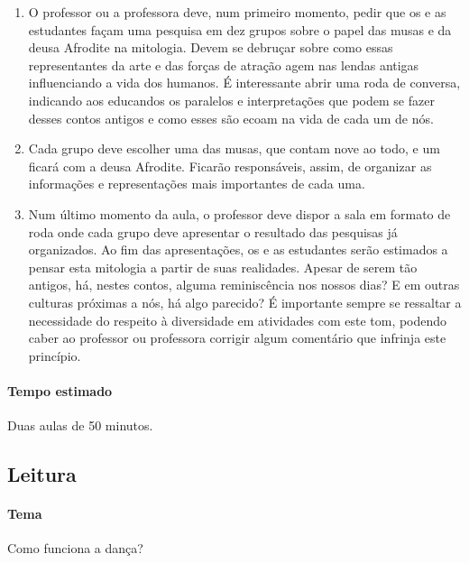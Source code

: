 \documentclass[12pt]{extarticle}
\begin{document}
\begin{enumerate}

  \item
  O professor ou a professora deve, num primeiro momento, pedir que os e as estudantes façam
  uma pesquisa em dez grupos sobre o papel das musas e da deusa Afrodite na mitologia. 
  Devem se debruçar sobre como essas representantes da arte e das forças de atração agem nas lendas antigas 
  influenciando a vida dos humanos. É interessante abrir uma roda de conversa, 
  indicando aos educandos os paralelos e interpretações que podem se fazer desses 
  contos antigos e como esses são ecoam na vida de cada um de nós.

  \item
  Cada grupo deve escolher uma das musas, que contam nove ao todo, e um ficará com a deusa
  Afrodite. Ficarão responsáveis, assim, de organizar as informações e representações
  mais importantes de cada uma. 

  \item
  Num último momento da aula, o professor deve dispor a sala em formato de 
  roda onde cada grupo deve apresentar o resultado das pesquisas já 
  organizados. Ao fim das apresentações, os e as estudantes serão estimados
  a pensar esta mitologia a partir de suas realidades. Apesar de serem tão antigos,
  há, nestes contos, alguma reminiscência nos nossos dias? E em outras culturas
  próximas a nós, há algo parecido? É importante sempre se ressaltar
  a necessidade do respeito à diversidade em atividades com este tom, podendo
  caber ao professor ou professora corrigir algum comentário que infrinja
  este princípio.

\end{enumerate}

\paragraph{Tempo estimado} Duas aulas de 50 minutos.

 
\subsection{Leitura}

\paragraph{Tema} Como funciona a dança?
\end{document}
